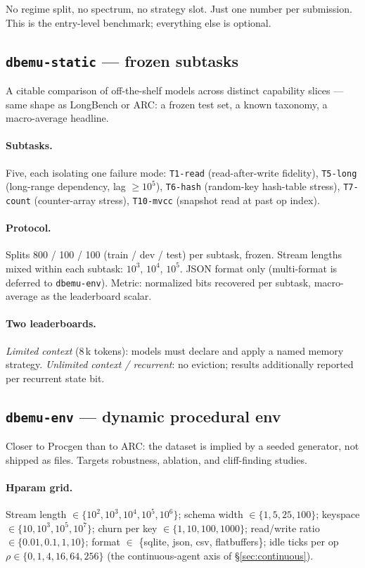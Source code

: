 \documentclass[11pt]{article}
\begin{document}
No regime split, no spectrum, no strategy slot. Just one number per
submission. This is the entry-level benchmark; everything else is
optional.

\subsection{\texttt{dbemu-static} --- frozen subtasks}

A citable comparison of off-the-shelf models across distinct capability
slices --- same shape as LongBench or ARC: a frozen test set, a known
taxonomy, a macro-average headline.

\paragraph{Subtasks.}
Five, each isolating one failure mode:
\texttt{T1-read} (read-after-write fidelity),
\texttt{T5-long} (long-range dependency, lag $\geq 10^5$),
\texttt{T6-hash} (random-key hash-table stress),
\texttt{T7-count} (counter-array stress),
\texttt{T10-mvcc} (snapshot read at past op index).

\paragraph{Protocol.}
Splits 800 / 100 / 100 (train / dev / test) per subtask, frozen.
Stream lengths mixed within each subtask: $10^3$, $10^4$, $10^5$.
JSON format only (multi-format is deferred to \texttt{dbemu-env}).
Metric: normalized bits recovered per subtask, macro-average as the
leaderboard scalar.

\paragraph{Two leaderboards.}
\emph{Limited context} (8\,k tokens): models must declare and apply a
named memory strategy. \emph{Unlimited context / recurrent}: no
eviction; results additionally reported per recurrent state bit.

\subsection{\texttt{dbemu-env} --- dynamic procedural env}

Closer to Procgen than to ARC: the dataset is implied by a seeded
generator, not shipped as files. Targets robustness, ablation, and
cliff-finding studies.

\paragraph{Hparam grid.}
Stream length $\in \{10^2, 10^3, 10^4, 10^5, 10^6\}$; schema width
$\in \{1, 5, 25, 100\}$; keyspace $\in \{10, 10^3, 10^5, 10^7\}$;
churn per key $\in \{1, 10, 100, 1000\}$; read/write ratio
$\in \{0.01, 0.1, 1, 10\}$; format
$\in$ \{sqlite, json, csv, flatbuffers\}; idle ticks per op
$\rho \in \{0, 1, 4, 16, 64, 256\}$ (the continuous-agent axis of
\S\ref{sec:continuous}).
\end{document}

